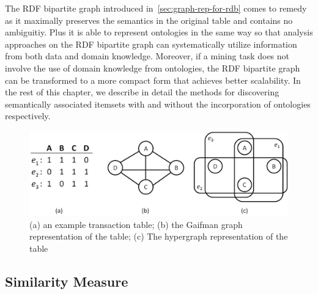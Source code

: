 The RDF bipartite graph introduced in~\ref{sec:graph-rep-for-rdb} comes to remedy as it maximally preserves the semantics in the original table and contains no ambiguitiy. Plus it is able to represent ontologies in the same way so that analysis approaches on the RDF bipartite graph can systematically utilize information from both data and domain knowledge. Moreover, if a mining task does not involve the use of domain knowledge from ontologies, the RDF bipartite graph can be transformed to a more compact form that achieves better scalability. In the rest of this chapter, we describe in detail the methods for discovering semantically associated itemsets with and without the incorporation of ontologies respectively.

\begin{figure}[tbh]
\begin{center}
\includegraphics[width=.8\textwidth]{fig/hg_and_rg1.eps}
\end{center}
\caption{\label{fig:hg_and_rg} (a) an example transaction table; (b) the Gaifman graph representation of the table; (c) The hypergraph representation of the table}
\end{figure}


\subsection{Similarity Measure}

